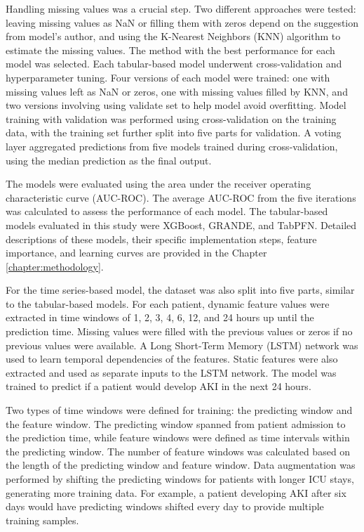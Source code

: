 \documentclass[../main.tex]{subfiles}
\begin{document}
Handling missing values was a crucial step. 
Two different approaches were tested: leaving missing values as NaN or filling them with zeros depend on the suggestion from model's author, and using the K-Nearest Neighbors (KNN) algorithm to estimate the missing values. 
The method with the best performance for each model was selected. 
Each tabular-based model underwent cross-validation and hyperparameter tuning. 
Four versions of each model were trained: one with missing values left as NaN or zeros, one with missing values filled by KNN, and two versions involving using validate set to help model avoid overfitting.
Model training with validation was performed using cross-validation on the training data, with the training set further split into five parts for validation. 
A voting layer aggregated predictions from five models trained during cross-validation, using the median prediction as the final output.

The models were evaluated using the area under the receiver operating characteristic curve (AUC-ROC). 
The average AUC-ROC from the five iterations was calculated to assess the performance of each model. 
The tabular-based models evaluated in this study were XGBoost, GRANDE, and TabPFN. 
Detailed descriptions of these models, their specific implementation steps, feature importance, and learning curves are provided in the Chapter \ref{chapter:methodology}.

For the time series-based model, the dataset was also split into five parts, similar to the tabular-based models. 
For each patient, dynamic feature values were extracted in time windows of 1, 2, 3, 4, 6, 12, and 24 hours up until the prediction time. 
Missing values were filled with the previous values or zeros if no previous values were available. 
A Long Short-Term Memory (LSTM) network was used to learn temporal dependencies of the features. 
Static features were also extracted and used as separate inputs to the LSTM network. 
The model was trained to predict if a patient would develop AKI in the next 24 hours.

Two types of time windows were defined for training: the predicting window and the feature window. 
The predicting window spanned from patient admission to the prediction time, while feature windows were defined as time intervals within the predicting window. 
The number of feature windows was calculated based on the length of the predicting window and feature window. 
Data augmentation was performed by shifting the predicting windows for patients with longer ICU stays, generating more training data. 
For example, a patient developing AKI after six days would have predicting windows shifted every day to provide multiple training samples.
\end{document}
